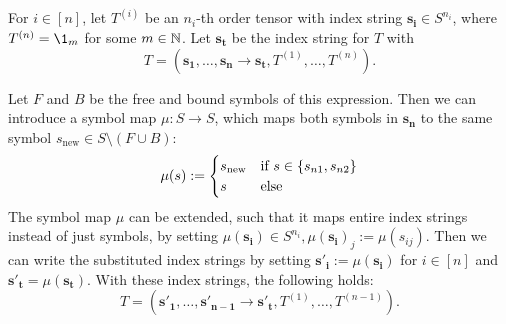 \begin{lemma}
    For $i \in [n]$, let $T^{(i)}$ be an $n_i$-th order tensor with index string $\bm{s_i} \in S^{n_i}$,
    where $T^{(n)} = \1_m$ for some $m \in \mathbb{N}$.
    Let $\bm{s_t}$ be the index string for $T$ with
    $$T = (\bm{s_1}, \dots, \bm{s_n} \rightarrow \bm{s_t}, T^{(1)}, \dots, T^{(n)}).$$

    Let $F$ and $B$ be the free and bound symbols of this expression.
    Then we can introduce a symbol map $\mu: S \rightarrow S$, which maps both symbols in $\bm{s_n}$ to the same symbol $s_{\text{new}} \in S \setminus (F \cup B)$:
    $$\mu(s) := \begin{cases}
            s_{\text{new}} & \text{if $s \in \lbrace s_{n1}, s_{n2} \rbrace$} \\
            s              & \text{else}
        \end{cases}$$
    The symbol map $\mu$ can be extended, such that it maps entire index strings instead of just symbols, by setting $\mu(\bm{s_i}) \in S^{n_i}, \mu(\bm{s_i})_j := \mu(s_{ij})$.
    Then we can write the substituted index strings by setting $\bm{s'_i} := \mu(\bm{s_i})$ for $i \in [n]$ and $\bm{s'_t} = \mu(\bm{s_t})$.
    With these index strings, the following holds:
    $$T = (\bm{s'_1}, \dots, \bm{s'_{n - 1}} \rightarrow \bm{s'_t}, T^{(1)}, \dots, T^{(n - 1)}).$$
\end{lemma}

